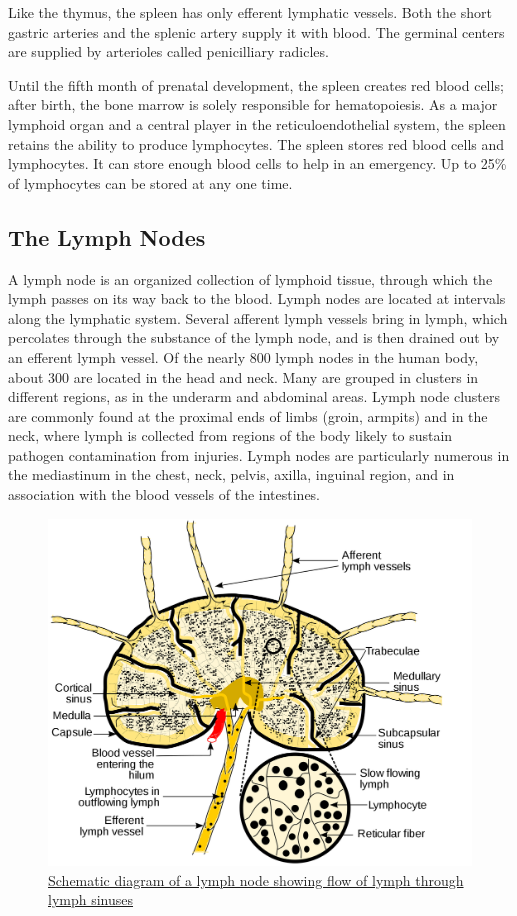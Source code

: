Like the thymus, the spleen has only efferent lymphatic vessels. Both the short gastric arteries and the splenic artery supply it with blood. The germinal centers are supplied by arterioles called penicilliary radicles.

Until the fifth month of prenatal development, the spleen creates red blood cells; after birth, the bone marrow is solely responsible for hematopoiesis. As a major lymphoid organ and a central player in the reticuloendothelial system, the spleen retains the ability to produce lymphocytes. The spleen stores red blood cells and lymphocytes. It can store enough blood cells to help in an emergency. Up to 25\% of lymphocytes can be stored at any one time.

\hypertarget{the-lymph-nodes}{%
\subsection{The Lymph Nodes}\label{the-lymph-nodes}}

A lymph node is an organized collection of lymphoid tissue, through which the lymph passes on its way back to the blood. Lymph nodes are located at intervals along the lymphatic system. Several afferent lymph vessels bring in lymph, which percolates through the substance of the lymph node, and is then drained out by an efferent lymph vessel. Of the nearly 800 lymph nodes in the human body, about 300 are located in the head and neck. Many are grouped in clusters in different regions, as in the underarm and abdominal areas. Lymph node clusters are commonly found at the proximal ends of limbs (groin, armpits) and in the neck, where lymph is collected from regions of the body likely to sustain pathogen contamination from injuries. Lymph nodes are particularly numerous in the mediastinum in the chest, neck, pelvis, axilla, inguinal region, and in association with the blood vessels of the intestines.



\begin{figure}

{\centering \includegraphics[width=0.7\linewidth]{./figures/immune/Schematic_of_lymph_node_showing_lymph_sinuses} 

}

\caption{\href{https://commons.wikimedia.org/wiki/File:Schematic_of_lymph_node_showing_lymph_sinuses.svg}{Schematic diagram of a lymph node showing flow of lymph through lymph sinuses}}\label{fig:lymphnode}
\end{figure}

